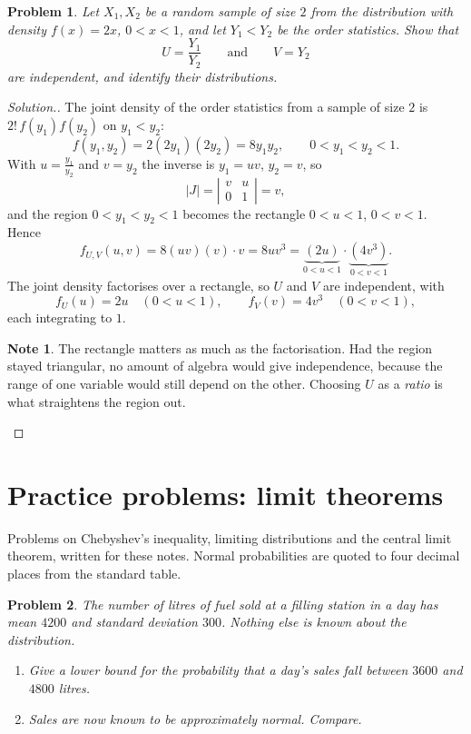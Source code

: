\documentclass[12pt,a4paper]{report}
\theoremstyle{definition}
\newtheorem{note}[thm]{Note}
\theoremstyle{plain}
\newtheorem{problemx}{Problem}[section]
\newenvironment{problem}{\begin{problemx}}{\end{problemx}}
\newenvironment{solution}
  {\renewcommand{\qedsymbol}{}\begin{proof}[\textit{Solution}.]}
  {\end{proof}}
\begin{document}
\begin{problem}
Let $X_1,X_2$ be a random sample of size $2$ from the distribution with density
$f(x)=2x$, $0<x<1$, and let $Y_1<Y_2$ be the order statistics. Show that
\[U=\frac{Y_1}{Y_2}\qquad\text{and}\qquad V=Y_2\]
are independent, and identify their distributions.
\end{problem}

\begin{solution}
The joint density of the order statistics from a sample of size $2$ is
$2!\,f(y_1)f(y_2)$ on $y_1<y_2$:
\[f\left(y_1,y_2\right)=2\left(2y_1\right)\left(2y_2\right)=8y_1y_2,
\qquad 0<y_1<y_2<1.\]
With $u=\frac{y_1}{y_2}$ and $v=y_2$ the inverse is $y_1=uv$, $y_2=v$, so
\[|J|=\left|\begin{matrix}v & u\\0 & 1\end{matrix}\right|=v,\]
and the region $0<y_1<y_2<1$ becomes the rectangle $0<u<1$, $0<v<1$. Hence
\[f_{U,V}(u,v)=8(uv)(v)\cdot v=8uv^3
=\underbrace{\left(2u\right)}_{0<u<1}\cdot
\underbrace{\left(4v^3\right)}_{0<v<1}.\]
The joint density factorises over a rectangle, so $U$ and $V$ are independent,
with
\[f_U(u)=2u\quad(0<u<1),\qquad f_V(v)=4v^3\quad(0<v<1),\]
each integrating to $1$.

\begin{note}
The rectangle matters as much as the factorisation. Had the region stayed
triangular, no amount of algebra would give independence, because the range of one
variable would still depend on the other. Choosing $U$ as a \emph{ratio} is what
straightens the region out.
\end{note}
\end{solution}


\section{Practice problems: limit theorems}

Problems on Chebyshev's inequality, limiting distributions and the central limit
theorem, written for these notes. Normal probabilities are quoted to four decimal
places from the standard table.

\begin{problem}
The number of litres of fuel sold at a filling station in a day has mean $4200$
and standard deviation $300$. Nothing else is known about the distribution.
\begin{enumerate}
\item[(a).] Give a lower bound for the probability that a day's sales fall between
$3600$ and $4800$ litres.
\item[(b).] Sales are now known to be approximately normal. Compare.
\end{enumerate}
\end{problem}
\end{document}
